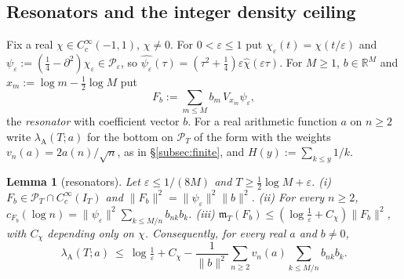 \documentclass[11pt]{amsart}
\newtheorem{lemma}[theorem]{Lemma}
\theoremstyle{definition}
\theoremstyle{remark}
\newcommand{\R}{\mathbb R}
\newcommand{\PT}{\mathcal P_T}
\newcommand{\IT}{I_T}
\newcommand{\mT}{\mathfrak m_T}
\begin{document}
\subsection{Resonators and the integer density ceiling}\label{subsec:reson}
Fix a real $\chi\in C_c^\infty(-1,1)$, $\chi\ne0$. For $0<\varepsilon\le1$ put $\chi_\varepsilon(t)=\chi(t/\varepsilon)$ and
$\psi_\varepsilon:=(\frac14-\partial^2)\chi_\varepsilon\in\mathcal P_\varepsilon$, so $\widehat{\psi_\varepsilon}(\tau)=(\tau^2+\frac14)\varepsilon\widehat\chi(\varepsilon\tau)$.
For $M\ge1$, $b\in\R^M$ and $x_m:=\log m-\frac12\log M$ put
\[
F_b:=\sum_{m\le M}b_m\,V_{x_m}\psi_\varepsilon,
\]
the \emph{resonator} with coefficient vector $b$. For a real arithmetic function $a$ on $n\ge2$ write
$\lambda_{\mathrm A}(T;a)$ for the bottom on $\PT$ of the form with the weights $v_n(a)=2a(n)/\sqrt n$, as in
\S\ref{subsec:finite}, and $H(y):=\sum_{k\le y}1/k$.

\begin{lemma}[resonators]\label{lem:reson}
Let $\varepsilon\le1/(8M)$ and $T\ge\frac12\log M+\varepsilon$.
\emph{(i)} $F_b\in\PT\cap C_c^\infty(\IT)$ and $\|F_b\|^2=\|\psi_\varepsilon\|^2\|b\|^2$.
\emph{(ii)} For every $n\ge2$, $c_{F_b}(\log n)=\|\psi_\varepsilon\|^2\sum_{k\le M/n}b_{nk}b_k$.
\emph{(iii)} $\mT(F_b)\le(\log\frac1\varepsilon+C_\chi)\|F_b\|^2$, with $C_\chi$ depending only on $\chi$.
Consequently, for every real $a$ and $b\ne0$,
\[
\lambda_{\mathrm A}(T;a)\ \le\ \log\tfrac1\varepsilon+C_\chi-\frac1{\|b\|^2}\sum_{n\ge2}v_n(a)\sum_{k\le M/n}b_{nk}b_k .
\]
\end{lemma}
\end{document}
